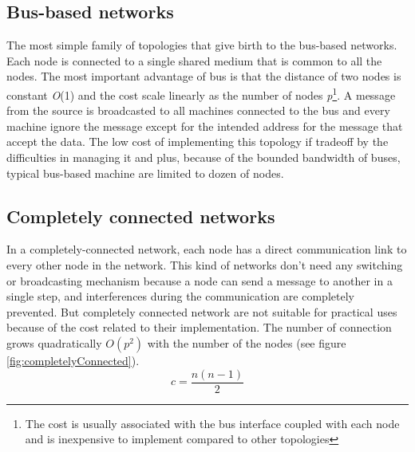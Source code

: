 \subsection{Bus-based networks}\label{bus-based}
The most simple family of topologies that give birth to the bus-based
networks. Each node is connected to a single shared medium that is common to all
the nodes. The most important advantage of bus is that the distance of two nodes is constant \textit{O}(1) and the cost scale linearly
as the number of nodes \textit{p}\footnote{The cost is usually associated with
the bus interface coupled with each node and is inexpensive to implement
compared to other topologies}.
A message from the source is broadcasted to all machines connected to the bus
and every machine ignore the message except for the intended address for the
message that accept the data. The low cost of implementing this topology if
tradeoff by the difficulties in managing it and plus, because of the bounded
bandwidth of buses, typical bus-based machine are limited to dozen of nodes.

\subsection{Completely connected networks}
In a completely-connected network, each node has a direct communication link to every other
node in the network. This kind of networks don't need any switching or
broadcasting mechanism because a node can send a message to another in a single
step, and interferences during the communication are completely prevented.
But completely connected network are not suitable for practical uses because of
the cost related to their implementation. The number of connection grows
quadratically \(O(p^2)\) with the number of the nodes (see figure
\ref{fig:completelyConnected}).
\[
c=\frac{n(n-1)}{2}
\]

